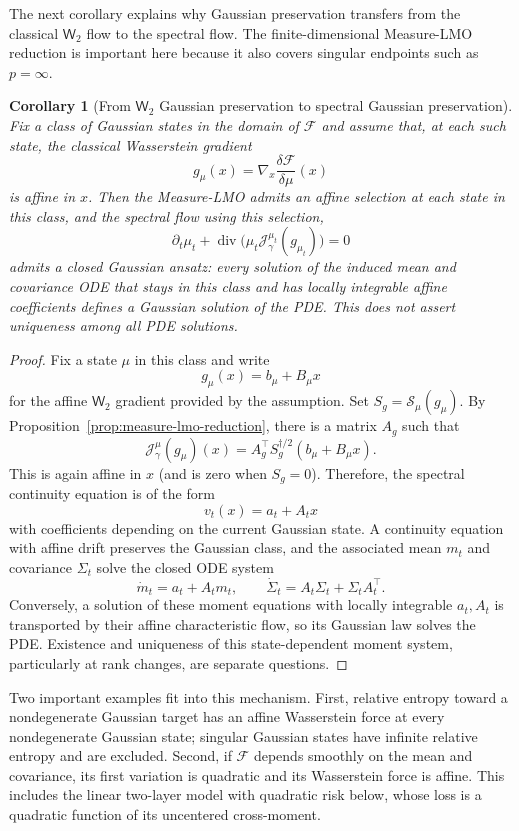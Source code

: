 \documentclass{article}
\newtheorem{corollary}[theorem]{Corollary}
\newcommand{\MF}{\mathcal{F}}
\newcommand{\MJ}{\mathcal{J}}
\newcommand{\Wtwo}{\mathsf{W}_2}
\newcommand{\divv}{\operatorname{div}}
\begin{document}
The next corollary explains why Gaussian preservation transfers from the
classical $\Wtwo$ flow to the spectral flow. The finite-dimensional
Measure-LMO reduction is important here because it also covers singular
endpoints such as $p=\infty$.

\begin{corollary}[From $\Wtwo$ Gaussian preservation to spectral Gaussian preservation]
\label{app-cor:w2-to-spectral-paper}
Fix a class of Gaussian states in the domain of $\MF$ and assume that,
at each such state, the classical Wasserstein gradient
$$
g_\mu(x)=\nabla_x\frac{\delta \MF}{\delta\mu}(x)
$$
is affine in $x$. Then the Measure-LMO admits an affine selection at each
state in this class, and the spectral flow using this selection,
$$
\partial_t\mu_t+\divv\!\bigl(\mu_t \MJ_\gamma^{\mu_t}(g_{\mu_t})\bigr)=0
$$
admits a closed Gaussian ansatz: every solution of the induced mean and
covariance ODE that stays in this class and has locally integrable affine
coefficients defines a Gaussian solution of the PDE. This does not assert
uniqueness among all PDE solutions.
\end{corollary}

\begin{proof}
Fix a state $\mu$ in this class and write
$$
g_\mu(x)=b_\mu+B_\mu x
$$
for the affine $\Wtwo$ gradient provided by the assumption. Set
$S_g=\mathcal S_\mu(g_\mu)$. By
Proposition~\ref{prop:measure-lmo-reduction}, there is a matrix $A_g$ such that
$$
\MJ_\gamma^\mu(g_\mu)(x)
=A_g^\top S_g^{\dagger/2}(b_\mu+B_\mu x).
$$
This is again affine in $x$ (and is zero when $S_g=0$). Therefore, the
spectral continuity equation is of the form
$$
v_t(x)=a_t+A_t x
$$
with coefficients depending on the current Gaussian state. A continuity equation with affine drift preserves the Gaussian class, and the associated mean $m_t$ and covariance $\Sigma_t$ solve the closed ODE system
$$
\dot m_t=a_t+A_t m_t,
\qquad
\dot \Sigma_t=A_t\Sigma_t+\Sigma_t A_t^\top.
$$
Conversely, a solution of these moment equations with locally integrable
$a_t,A_t$ is transported by their affine characteristic flow, so its Gaussian
law solves the PDE. Existence and uniqueness of this state-dependent moment
system, particularly at rank changes, are separate questions.
\end{proof}

Two important examples fit into this mechanism. First, relative entropy
toward a nondegenerate Gaussian target has an affine Wasserstein force at
every nondegenerate Gaussian state; singular Gaussian states have infinite
relative entropy and are excluded. Second, if $\MF$ depends smoothly on
the mean and covariance, its first variation is quadratic and its
Wasserstein force is affine. This includes the linear two-layer model with
quadratic risk below, whose loss is a quadratic function of its uncentered
cross-moment.
\end{document}
